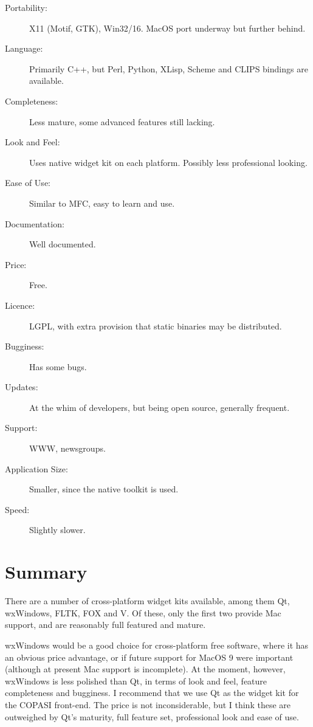 \documentclass[12pt,a4paper]{article}
\begin{document}
\begin{description}
\item[Portability:]X11 (Motif, GTK), Win32/16. MacOS port underway but
  further behind.
\item[Language:] Primarily C++, but Perl, Python, XLisp, Scheme and
  CLIPS bindings are available.
\item[Completeness:] Less mature, some advanced features still lacking.
\item[Look and Feel:]Uses native widget kit on each platform. Possibly
  less professional looking.
\item[Ease of Use:] Similar to MFC, easy to learn and use.
\item[Documentation:] Well documented.
\item[Price:]Free.
\item[Licence:]LGPL, with extra provision that static binaries may be
  distributed.
\item[Bugginess:] Has some bugs.
\item[Updates:] At the whim of developers, but being open source,
  generally frequent.
\item[Support:]WWW, newsgroups.
\item[Application Size:] Smaller, since the native toolkit is used.
\item[Speed:] Slightly slower.

\end{description}

\section*{Summary}

There are a number of cross-platform widget kits available, among them
Qt, wxWindows, FLTK, FOX and V. Of these, only the first two provide
Mac support, and are reasonably full featured and mature.

wxWindows would be a good choice for cross-platform free software,
where it has an obvious price advantage, or if future support for
MacOS 9 were important (although at present Mac support is incomplete).
At the moment, however, wxWindows is less polished than Qt, in terms
of look and feel, feature completeness and bugginess. I recommend that
we use Qt as the widget kit for the COPASI front-end. The price is not
inconsiderable, but I think these are outweighed by Qt's maturity,
full feature set, professional look and ease of use.
\end{document}
